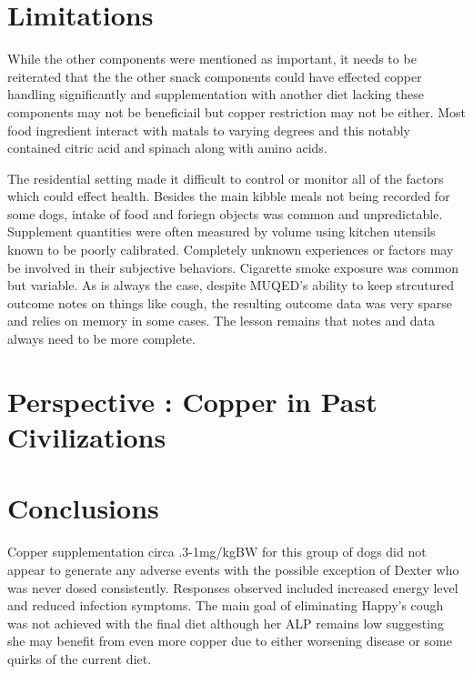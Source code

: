 \section{Limitations}
While the other components were mentioned as important,
it needs to be reiterated that the 
the other snack components could have effected copper handling
significantly and supplementation with another diet lacking
these components may not be beneficiail but copper restriction
may not be either. Most food ingredient interact with matals 
to varying degrees and this notably contained citric acid
and spinach along with amino acids. 

The residential setting made it difficult to control or monitor
all of the factors which could effect health. Besides the main
kibble meals not being recorded for some dogs, intake of food
and foriegn objects was common and unpredictable. 
Supplement quantities were often measured by volume using kitchen
utensils known to be poorly calibrated. 
Completely unknown experiences or factors may be involved in their
subjective behaviors.  Cigarette smoke exposure was common
but variable.
As is always the case, despite MUQED's ability to keep strcutured
outcome notes on things like cough, the resulting outcome
data was very sparse and relies on memory in some cases.
The lesson remains that notes and data always need to be
more complete. 


\section{Perspective : Copper in Past Civilizations }







\section{Conclusions}


Copper supplementation circa .3-1mg/kgBW for this group of dogs
did not appear to generate any adverse events with the possible
exception of Dexter who was never dosed consistently. 
Responses observed included increased energy level and  reduced 
infection symptoms.
The main goal of eliminating Happy's
cough was not achieved with the final diet although her ALP
remains low suggesting she may benefit from even more copper
due to either worsening disease or some quirks of the current diet.

